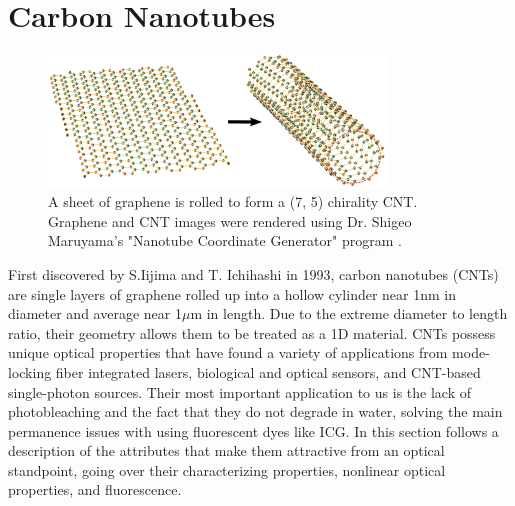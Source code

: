 \chapter{Carbon Nanotubes}
\begin{figure}[htb!]
	\centering
	\includegraphics[width=0.8\textwidth]{./Figures/CNTs/graphine_cnt.png}
	\caption{A sheet of graphene is rolled to form a (7, 5) chirality CNT. Graphene and CNT  images were rendered using Dr. Shigeo  Maruyama's  "Nanotube Coordinate Generator" program \cite{maruyama2}.}
	\label{fig:grahine_cnt}
\end{figure}
First discovered by S.Iijima and T. Ichihashi in 1993, carbon nanotubes (CNTs) are single layers of graphene rolled up into a hollow cylinder near 1nm in diameter and average near 1$\mu$m in length. Due to the extreme diameter to length ratio, their geometry allows them to be treated as a 1D material. CNTs possess unique optical properties that have found a variety of applications from mode-locking fiber integrated lasers\cite{fl1, fl2, fl3, fl4}, biological and optical sensors\cite{boghossian, heller}, and CNT-based single-photon sources\cite{he}. Their most important application to us is the lack of photobleaching and the fact that they do not degrade in water, solving the main permanence issues with using fluorescent dyes like ICG. In this section follows a description of the attributes that make them attractive from an optical standpoint, going over their characterizing properties, nonlinear optical properties, and fluorescence.
